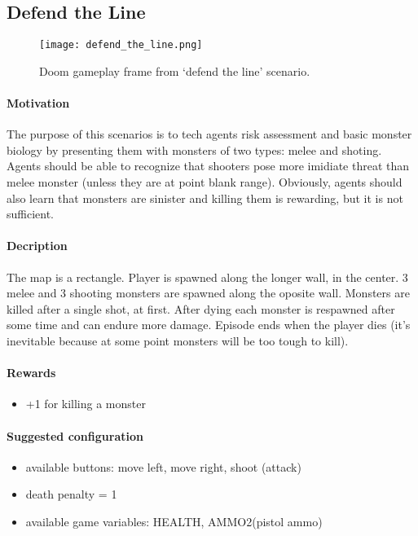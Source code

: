 	\subsection{Defend the Line}
		\begin{figure}
			\centering
			\texttt{[image: defend\_the\_line.png]}
			\caption{Doom gameplay frame from `defend the line' scenario.}\label{fig:defend_the_line}
		\end{figure}
		\paragraph{Motivation} 
			The purpose of this scenarios is to tech agents risk assessment and basic monster biology by presenting them with monsters of two types: melee and shoting. Agents should be able to recognize that shooters pose more imidiate threat than melee monster (unless they are at point blank range). Obviously, agents should also learn that monsters are sinister and killing them is rewarding, but it is not sufficient.
		\paragraph{Decription}
			The map is a rectangle. Player is spawned along the longer wall, in the center. 3 melee and 3 shooting monsters are spawned along the oposite wall. Monsters are killed after a single shot, at first. After dying each monster is respawned after some time and can endure more damage. Episode ends when the player dies (it's inevitable because at some point monsters will be too tough to kill).
		\paragraph{Rewards}
			\begin{itemize}
				\item +1 for killing a monster
			\end{itemize}

		\paragraph{Suggested configuration}
			\begin{itemize}
				\item available buttons: move left, move right, shoot (attack)
				\item death penalty = 1
				\item available game variables: HEALTH, AMMO2(pistol ammo)
			\end{itemize}
	\newpage

